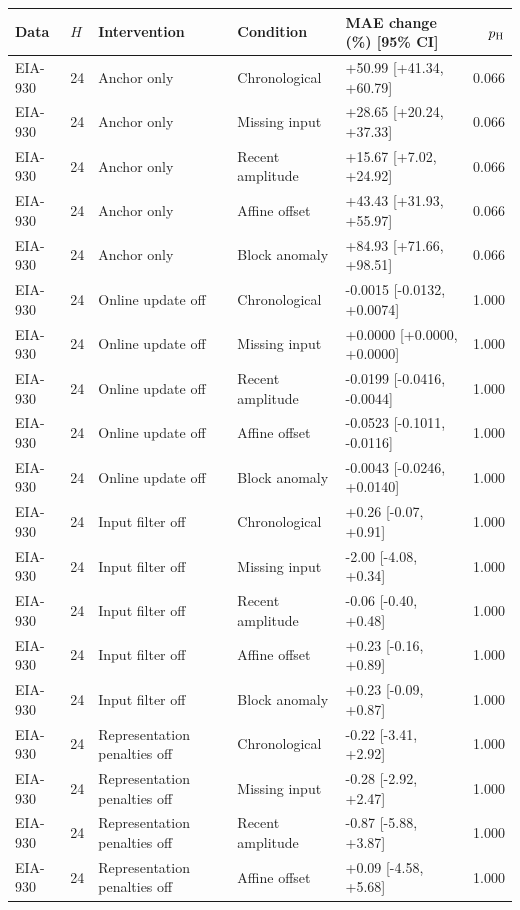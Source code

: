 {
\footnotesize
\begin{longtable}{lllp{2.5cm}p{4.1cm}r}
\toprule
Data & $H$ & Intervention & Condition & MAE change (\%) [95\% CI] & $p_{\rm H}$ \\
\midrule
\endhead
EIA-930 & 24 & Anchor only & Chronological & +50.99 [+41.34, +60.79] & 0.066 \\
EIA-930 & 24 & Anchor only & Missing input & +28.65 [+20.24, +37.33] & 0.066 \\
EIA-930 & 24 & Anchor only & Recent amplitude & +15.67 [+7.02, +24.92] & 0.066 \\
EIA-930 & 24 & Anchor only & Affine offset & +43.43 [+31.93, +55.97] & 0.066 \\
EIA-930 & 24 & Anchor only & Block anomaly & +84.93 [+71.66, +98.51] & 0.066 \\
EIA-930 & 24 & Online update off & Chronological & -0.0015 [-0.0132, +0.0074] & 1.000 \\
EIA-930 & 24 & Online update off & Missing input & +0.0000 [+0.0000, +0.0000] & 1.000 \\
EIA-930 & 24 & Online update off & Recent amplitude & -0.0199 [-0.0416, -0.0044] & 1.000 \\
EIA-930 & 24 & Online update off & Affine offset & -0.0523 [-0.1011, -0.0116] & 1.000 \\
EIA-930 & 24 & Online update off & Block anomaly & -0.0043 [-0.0246, +0.0140] & 1.000 \\
EIA-930 & 24 & Input filter off & Chronological & +0.26 [-0.07, +0.91] & 1.000 \\
EIA-930 & 24 & Input filter off & Missing input & -2.00 [-4.08, +0.34] & 1.000 \\
EIA-930 & 24 & Input filter off & Recent amplitude & -0.06 [-0.40, +0.48] & 1.000 \\
EIA-930 & 24 & Input filter off & Affine offset & +0.23 [-0.16, +0.89] & 1.000 \\
EIA-930 & 24 & Input filter off & Block anomaly & +0.23 [-0.09, +0.87] & 1.000 \\
EIA-930 & 24 & Representation penalties off & Chronological & -0.22 [-3.41, +2.92] & 1.000 \\
EIA-930 & 24 & Representation penalties off & Missing input & -0.28 [-2.92, +2.47] & 1.000 \\
EIA-930 & 24 & Representation penalties off & Recent amplitude & -0.87 [-5.88, +3.87] & 1.000 \\
EIA-930 & 24 & Representation penalties off & Affine offset & +0.09 [-4.58, +5.68] & 1.000 \\

\end{longtable}}
